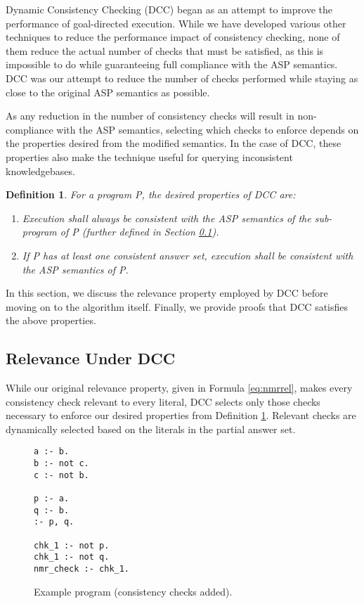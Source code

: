 \documentclass{new_tlp}
\newtheorem{definition}{Definition}
\begin{document}
Dynamic Consistency Checking (DCC) began as an attempt to improve the 
performance of goal-directed execution. While we have developed various other 
techniques to reduce the performance impact of consistency checking, none of
them reduce the actual number of checks that must be satisfied, as this is
impossible to do while guaranteeing full compliance with the ASP semantics. DCC
was our attempt to reduce the number of checks performed while staying as close
to the original ASP semantics as possible.

As any reduction in the number of consistency checks will result in 
non-compliance with the ASP semantics, selecting which checks to enforce 
depends on the properties desired from the modified semantics. In the case of 
DCC, these properties also make the technique useful for querying inconsistent
knowledgebases.
\begin{definition} \label{def:properties}
For a program P, the \textit{desired properties} of DCC are:
\begin{enumerate}
\item Execution shall always be consistent with the ASP semantics of the
	sub-program of P (further defined in Section \ref{sec:dccrelevance}).
\item If P has at least one consistent answer set, execution shall be 
	consistent with the ASP semantics of P.
\end{enumerate}
\end{definition}

In this section, we discuss the relevance property employed by DCC before 
moving on to the algorithm itself. Finally, we provide proofs that DCC 
satisfies the above properties.


\subsection{Relevance Under DCC} \label{sec:dccrelevance}

While our original relevance property, given in Formula \ref{eq:nmrrel}, makes
every consistency check relevant to every literal, DCC selects only those
checks necessary to enforce our desired properties from Definition 
\ref{def:properties}. Relevant checks are dynamically selected based on the 
literals in the partial answer set.

\begin{figure}
\figrule
\begin{verbatim}
a :- b.
b :- not c.
c :- not b.

p :- a.
q :- b.
:- p, q.

chk_1 :- not p.
chk_1 :- not q.
nmr_check :- chk_1.
\end{verbatim}
\caption{Example program (consistency checks added).} \label{fig:example1}
\figrule
\end{figure}
\end{document}
